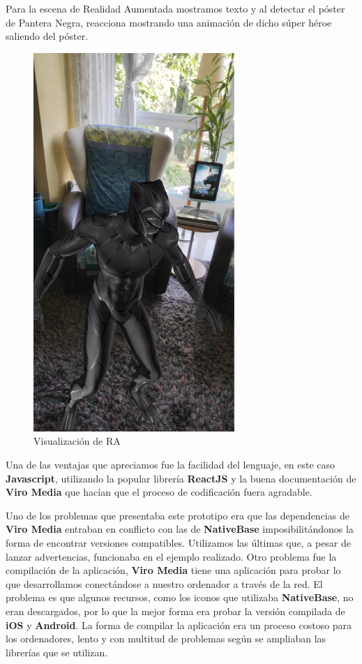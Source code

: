 \begin{flushleft}
Para la escena de Realidad Aumentada mostramos texto y al detectar el póster de Pantera Negra,
 reacciona mostrando una animación de dicho súper héroe saliendo del póster.
\end{flushleft}
 
\begin{figure}[H]
    \centering
    \includegraphics[width=3in]{figures/chapter-3/viromedia/blackpanther.png}
    \caption{Visualización de RA}
\end{figure}

\begin{flushleft}
Una de las ventajas que apreciamos fue la facilidad del lenguaje, en este caso \textbf{Javascript},
 utilizando la popular librería \textbf{ReactJS} y la buena documentación de \textbf{Viro Media}
 que hacían que el proceso de codificación fuera agradable.
\end{flushleft}
\begin{flushleft}
Uno de los problemas que presentaba este prototipo era que las dependencias de \textbf{Viro Media} entraban en conflicto con las de \textbf{NativeBase}
imposibilitándonos la forma de encontrar versiones compatibles. Utilizamos las últimas que, a pesar de lanzar
 advertencias, funcionaba en el ejemplo realizado.
Otro problema fue la compilación de la aplicación, \textbf{Viro Media} tiene una aplicación para probar lo
 que desarrollamos conectándose a nuestro ordenador a través de la red. El problema es
 que algunos recursos, como los iconos que utilizaba \textbf{NativeBase}, no eran descargados, por lo que la
 mejor forma era probar la versión compilada de \textbf{iOS} y \textbf{Android}. La forma de compilar
 la aplicación era un proceso costoso para los ordenadores, lento y con multitud de problemas según
 se ampliaban las librerías que se utilizan.
\end{flushleft}

